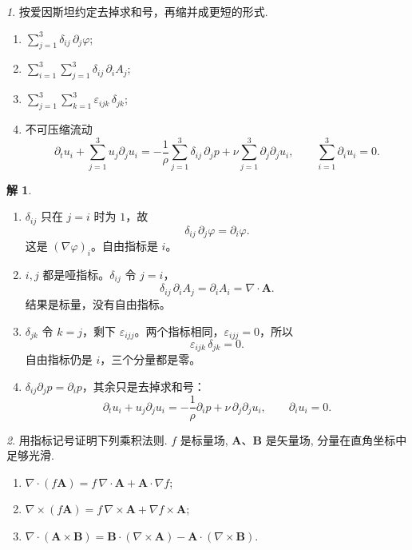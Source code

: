 \documentclass[11pt]{article}
\theoremstyle{remark}
\newtheorem{problem}{}
\theoremstyle{definition}
\newtheorem{solution}{解}
\begin{document}
\begin{problem}
  按爱因斯坦约定去掉求和号，再缩并成更短的形式.
  \begin{enumerate}
    \item $\displaystyle\sum_{j=1}^{3}\delta_{ij}\,\partial_j\varphi$;
    \item $\displaystyle\sum_{i=1}^{3}\sum_{j=1}^{3}\delta_{ij}\,\partial_i A_j$;
    \item $\displaystyle\sum_{j=1}^{3}\sum_{k=1}^{3}\varepsilon_{ijk}\,\delta_{jk}$;
    \item 不可压缩流动
      \[
        \partial_t u_i
        +\sum_{j=1}^{3}u_j\partial_j u_i
        =-\frac{1}{\rho}\sum_{j=1}^{3}\delta_{ij}\,\partial_j p
         +\nu\sum_{j=1}^{3}\partial_j\partial_j u_i,
        \qquad
        \sum_{i=1}^{3}\partial_i u_i=0.
      \]
  \end{enumerate}
\end{problem}

\begin{solution}
\begin{enumerate}
  \item $\delta_{ij}$ 只在 $j=i$ 时为 $1$，故
    \[
      \delta_{ij}\,\partial_j\varphi=\partial_i\varphi.
    \]
    这是 $(\nabla\varphi)_i$。自由指标是 $i$。
  \item $i,j$ 都是哑指标。$\delta_{ij}$ 令 $j=i$，
    \[
      \delta_{ij}\,\partial_i A_j=\partial_i A_i=\nabla\cdot\mathbf{A}.
    \]
    结果是标量，没有自由指标。
  \item $\delta_{jk}$ 令 $k=j$，剩下 $\varepsilon_{ijj}$。两个指标相同，$\varepsilon_{ijj}=0$，所以
    \[
      \varepsilon_{ijk}\,\delta_{jk}=0.
    \]
    自由指标仍是 $i$，三个分量都是零。
  \item $\delta_{ij}\partial_j p=\partial_i p$，其余只是去掉求和号：
    \[
      \partial_t u_i+u_j\partial_j u_i
      =-\frac{1}{\rho}\partial_i p+\nu\,\partial_j\partial_j u_i,
      \qquad
      \partial_i u_i=0.
    \]
\end{enumerate}
\end{solution}

\begin{problem}
  用指标记号证明下列乘积法则. $f$ 是标量场, $\mathbf{A}$、$\mathbf{B}$ 是矢量场, 分量在直角坐标中足够光滑.
  \begin{enumerate}
    \item $\displaystyle
      \nabla\cdot(f\mathbf{A})
      =f\,\nabla\cdot\mathbf{A}+\mathbf{A}\cdot\nabla f$;
    \item $\displaystyle
      \nabla\times(f\mathbf{A})
      =f\,\nabla\times\mathbf{A}+\nabla f\times\mathbf{A}$;
    \item $\displaystyle
      \nabla\cdot(\mathbf{A}\times\mathbf{B})
      =\mathbf{B}\cdot(\nabla\times\mathbf{A})
       -\mathbf{A}\cdot(\nabla\times\mathbf{B})$.
  \end{enumerate}
\end{problem}
\end{document}

